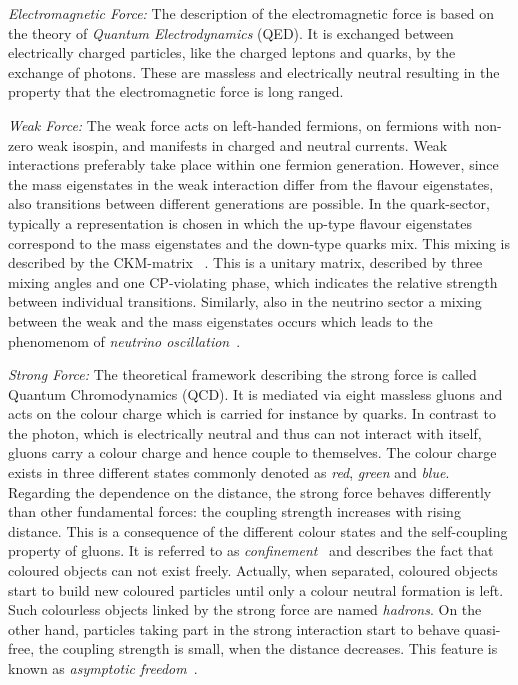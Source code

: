 \begin{description}
\begin{description}
  \item \textit{Electromagnetic Force:} The description of the electromagnetic force is based on the theory of \textit{Quantum Electrodynamics} (QED). It is exchanged between electrically charged particles, like the charged leptons and quarks, by the exchange of photons. These are massless and electrically neutral resulting in the property that the electromagnetic force is long ranged.
  \item \textit{Weak Force:} The weak force acts on left-handed fermions, \ie on fermions with non-zero weak isospin, and manifests in charged and neutral currents. Weak interactions preferably take place within one fermion generation. However, since the mass eigenstates in the weak interaction differ from the flavour eigenstates, also transitions between different generations are possible. In the quark-sector, typically a representation is chosen in which the up-type flavour eigenstates correspond to the mass eigenstates and the down-type quarks mix. This mixing is described by the CKM-matrix ~\cite{PhysRevLett.10.531, PTP.49.652}. This is a unitary matrix, described by three mixing angles and one CP-violating phase, which indicates the relative strength between individual transitions. Similarly, also in the neutrino sector a mixing between the weak and the mass eigenstates occurs which leads to the phenomenom of \textit{neutrino oscillation}~\cite{Maki:1962mu, Pontecorvo:1967fh, Fukuda:1998mi}.
  \item \textit{Strong Force:} The theoretical framework describing the strong force is called Quantum Chromodynamics (QCD). It is mediated via eight massless gluons and acts on the colour charge which is carried for instance by quarks. In contrast to the photon, which is electrically neutral and thus can not interact with itself, gluons carry a colour charge and hence couple to themselves. The colour charge exists in three different states commonly denoted as \textit{red}, \textit{green} and \textit{blue}. \\
Regarding the dependence on the distance, the strong force behaves differently than other fundamental forces: the coupling strength increases with rising distance. This is a consequence of the different colour states and the self-coupling property of gluons. It is referred to as \textit{confinement}~\cite{Alkofer:2006fu} and describes the fact that coloured objects can not exist freely. Actually, when separated, coloured objects start to build new coloured particles until only a colour neutral formation is left. Such colourless objects linked by the strong force are named \textit{hadrons}. On the other hand, particles taking part in the strong interaction start to behave quasi-free, \ie the coupling strength is small, when the distance decreases. This feature is known as \textit{asymptotic freedom}~\cite{PhysRevLett.30.1346, PhysRevLett.30.1343}. \\

\end{description}
\end{description}
